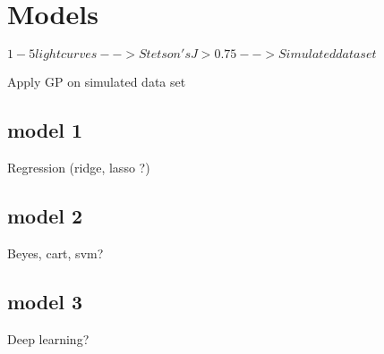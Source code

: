 \section{Models} \label{sec.models}


$1-5 light curves --> Stetson's J > 0.75 --> Simulated data set$

Apply GP on simulated data set

\subsection{model 1}
Regression (ridge, lasso ?)

\subsection{model 2}
Beyes, cart, svm?

\subsection{model 3}
Deep learning?
